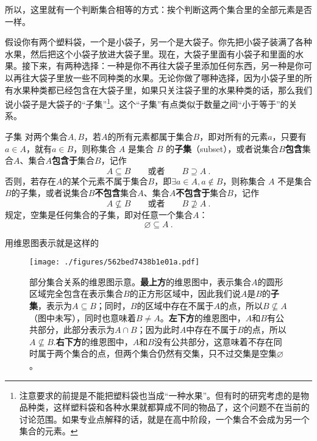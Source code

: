所以，这里就有一个判断集合相等的方式：挨个判断这两个集合里的全部元素是否一样。


假设你有两个塑料袋，一个是小袋子，另一个是大袋子。你先把小袋子装满了各种水果，然后把这个小袋子放进大袋子里。现在，大袋子里面有小袋子和里面的水果。接下来，有两种选择：一种是你不再往大袋子里添加任何东西，另一种是你可以再往大袋子里放一些不同种类的水果。无论你做了哪种选择，因为小袋子里的所有水果种类都已经包含在大袋子里，如果只关注袋子里的水果种类的话，那么我们说小袋子是大袋子的“子集”\footnote{注意要求的前提是不能把塑料袋也当成“一种水果”。但有时的研究考虑的是物品种类，这样塑料袋和各种水果就都算成不同的物品了，这个问题不在当前的讨论范围。如果专业点解释的话，就是在高中阶段，一个集合不会成为另一个集合的元素。}。这个“子集”有点类似于数量之间“小于等于”的关系。

\begin{definition}{子集}\label{def_HsSet_3}
对两个集合$A,B$，若$A$的所有元素都属于集合$B$，即对所有的元素$a$，只要有$a\in A$，就有$a\in B$，则称集合 $A$ 是集合 $B$ 的\textbf{子集}（subset），或者说集合$B$\textbf{包含}集合$A$、集合$A$\textbf{包含于}集合$B$，记作
\begin{equation}
A \subseteq B\qquad\text{或者}\qquad B \supseteq A~.
\end{equation}
否则，若存在$A$的某个元素不属于集合$B$，即$\exists a\in A,a\notin B$，则称集合 $A$ 不是集合$B$的子集，或者说集合$B$\textbf{不包含}集合$A$、集合$A$\textbf{不包含于}集合$B$，记作
\begin{equation}
A \nsubseteq B\qquad\text{或者}\qquad B \nsupseteq A~.
\end{equation}
规定，空集是任何集合的子集，即对任意一个集合$A$：
\begin{equation}
\varnothing \subseteq A~.
\end{equation}
\end{definition}

用维恩图表示就是这样的
\begin{figure}[ht]
\centering
\texttt{[image: ./figures/562bed7438b1e01a.pdf]}
\caption{部分集合关系的维恩图示意。\textbf{最上方}的维恩图中，表示集合$A$的圆形区域完全包含在表示集合$B$的正方形区域中，因此我们说$A$是$B$的\textbf{子集}，表示为$A\subseteq B$；同时，$B$的区域中存在不属于$A$的点，所以$B\not\subseteq A$（图中未写），同时也意味着$B\neq A$。\textbf{左下方}的维恩图中，$A$和$B$有公共部分，此部分表示为$A\cap B$；因为此时$A$中存在不属于$B$的点，所以$A\not\subseteq B$.\textbf{右下方}的维恩图中，$A$和$B$没有公共部分，这意味着不存在同时属于两个集合的点，但两个集合仍然有交集，只不过交集是空集$\varnothing$。} \label{fig_HsSet_3}
\end{figure}

